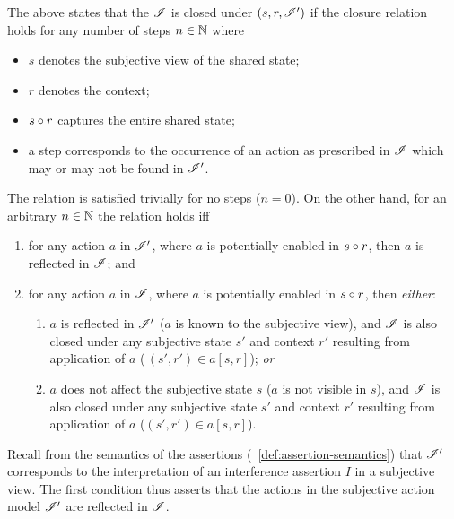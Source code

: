 %

The above states that the $\mathscr{I}$ is closed under $(s, r, \mathscr{I}')$ if the closure relation holds for any number of steps $n \in \mathbb{N}$ where 
\begin{itemize}
	\item $s$ denotes the subjective view of the shared state; \vspace{-5pt}
	\item $r$ denotes the context; \vspace{-5pt}
	\item $s \circ r$ captures the entire shared state; \vspace{-5pt}
	\item a step corresponds to the occurrence of an action as prescribed in $\mathscr{I}$ which may or may not be found in $\mathscr{I}'$. %
\end{itemize}   
%
The relation is satisfied trivially for no steps ($n = 0$). On the other hand, for an arbitrary $n\in \mathbb{N}$ the relation holds iff 
%
\begin{enumerate}
	\item for any action $a$ in $\mathscr{I}'$, where $a$ is potentially enabled in $s \circ r$, then $a$ is reflected in $\mathscr{I}$; and
	\item for any action $a$ in $\mathscr{I}$, where $a$ is potentially enabled in $s \circ r$, then \textit{either}:
	\begin{enumerate}\renewcommand{\theenumi}{\alph{enumi}}
		\item $a$ is reflected in $\mathscr{I}'$ ($a$ is known to the subjective view), and $\mathscr{I}$ is also closed under any subjective state $s'$ and context $r'$ resulting from application of $a$ ($\,(s', r') \in a[s, r]$); \textit{or} 
		\item  \label{item:closure4}
		$a$ does not affect the subjective state $s$ ($a$ is not visible in $s$), and $\mathscr{I}$ is also closed under any subjective state $s'$ and context $r'$ resulting from application of $a$ ($(s', r') \in a[s, r]$). 
	\end{enumerate}
%
\end{enumerate}
%
Recall from the semantics of the assertions (~\ref{def:assertion-semantics}) that $\mathscr{I}'$ corresponds to the interpretation of an interference assertion $I$ in a subjective view. The first condition thus asserts that the actions in the subjective action model $\mathscr{I}'$ are reflected in $\mathscr{I}$.

